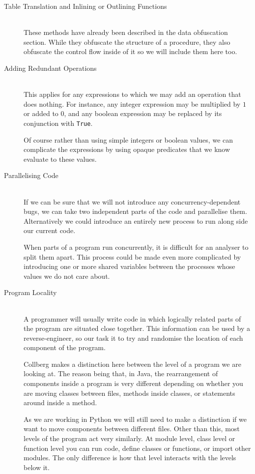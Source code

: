 \documentclass[twoside,a4paper]{report}
\begin{document}
\begin{description}
\item[Table Translation and Inlining or Outlining Functions] \hfill \\
These methods have already been described in the data obfuscation section. While they obfuscate the structure of a procedure,
they also obfuscate the control flow inside of it so we will include them here too.

\item[Adding Redundant Operations] \hfill \\
This applies for any expressions to which we may add an operation that does nothing. For instance, any integer expression may
be multiplied by $1$ or added to $0$, and any boolean expression may be replaced by its conjunction with \texttt{True}.

Of course rather than using simple integers or boolean values, we can complicate the expressions by using opaque predicates
that we know evaluate to these values.

\item[Parallelising Code] \hfill \\
If we can be sure that we will not introduce any concurrency-dependent bugs, we can take two independent parts of
the code and parallelise them. Alternatively we could introduce an entirely new process to run along side our current code.

When parts of a program run concurrently, it is difficult for an analyser to split them apart. This process could be made even more complicated
by introducing one or more shared variables between the processes whose values we do not care about.

\item[Program Locality] \hfill \\
A programmer will usually write code in which logically related parts of the program are situated close together. This information
can be used by a reverse-engineer, so our task it to try and randomise the location of each component of the program.

Collberg makes a distinction here between the level of a program we are looking at. The reason being that, in Java, the rearrangement of components
inside a program is very different depending on whether you are moving classes between files, methods inside classes, or statements around
inside a method.

As we are working in Python we will still need to make a distinction if we want to move components between different files. Other
than this, most levels of the program act very similarly. At module level, class level or function level you can run code, define
classes or functions, or import other modules. The only difference is how that level interacts with the levels below it.

\end{description}
\end{document}
